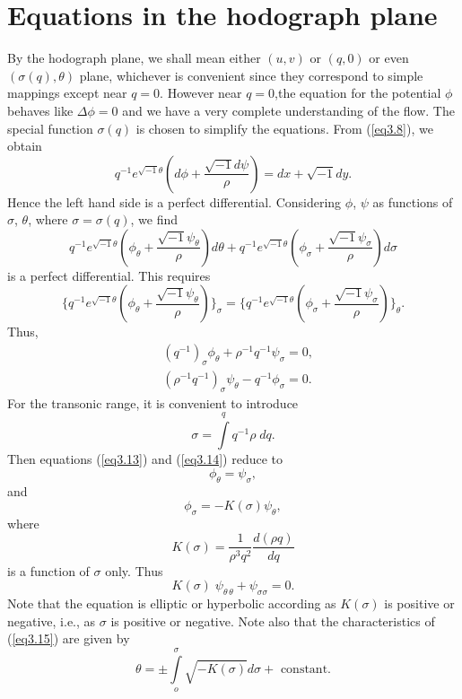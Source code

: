 \section{Equations in the hodograph plane}\label{chap3:sec3.5}
By the hodograph plane, we shall mean either $(u,v)$ or $(q,0)$ or even $(\sigma (q), \theta)$ plane, whichever is convenient since they correspond to simple mappings except near $q = 0$. However near $q=0$,\pageoriginale the equation for the potential $\phi$ behaves like $\Delta \phi =0$ and we have a very complete understanding of the flow. The special function $\sigma (q)$ is chosen to simplify the equations. From (\ref{eq3.8}), we obtain
$$
q^{-1} e^{\sqrt{-1} \theta} (d \phi + \frac{\sqrt{-1} d\psi}{\rho}) = dx + \sqrt{-1} dy. 
$$
Hence the left hand side is a perfect differential. Considering $\phi$, $\psi$ as functions of $\sigma$, $\theta$, where $\sigma = \sigma (q)$, we find 
$$
q^{-1} e^{\sqrt{-1}\theta} (\phi_\theta + \frac{\sqrt{-1} \psi_\theta}{\rho}) d \theta + q^{-1}  e^{\sqrt{-1} \theta} (\phi_\sigma + \frac{\sqrt{-1} \psi_\sigma}{\rho}) d\sigma
$$
is a perfect differential. This requires
$$
\{q^{-1} e^{\sqrt{-1} \theta} (\phi_\theta + \frac{\sqrt{-1} \psi_\theta}{\rho})\}_\sigma = \{ q^{-1} e^{\sqrt{-1} \theta} (\phi_\sigma + \frac{\sqrt{-1} \psi_\sigma}{\rho}) \}_\theta.
$$
Thus,
\begin{align*}
& (q^{-1})_\sigma\phi_\theta + \rho^{-1} q^{-1} \psi_\sigma = 0, \tag{3.13}\label{eq3.13}\\
& (\rho^{-1} q^{-1})_\sigma \psi_\theta - q^{-1} \phi_\sigma = 0. \tag{3.14}\label{eq3.14}
\end{align*}
For the transonic range, it is convenient to introduce
$$
\sigma = \int\limits^q q^{-1} \rho \; d q.
$$
Then  equations (\ref{eq3.13}) and (\ref{eq3.14}) reduce to 
$$
\phi_\theta = \psi_\sigma,
$$
and
$$
\phi_\sigma = - K(\sigma) \psi_\theta,
$$
where
$$
K(\sigma) = \frac{1}{\rho^3 q^2} \frac{d(\rho q)}{dq}
$$\pageoriginale 
is a function of $\sigma$ only. Thus
\begin{equation*}
K(\sigma) \; \psi_{\theta \, \theta} + \psi_{\sigma \sigma} = 0.  \tag{3.15}\label{eq3.15}
\end{equation*}
Note that the equation is elliptic or hyperbolic according as $K(\sigma)$ is positive or negative, i.e., as $\sigma$ is positive or negative. Note also that the characteristics of (\ref{eq3.15}) are given by
\begin{equation*}
\theta = \pm \int\limits^\sigma_o\sqrt{-K(\sigma)} d \sigma + \text{ constant}. 
\tag{3.16}\label{eq3.16}
\end{equation*}

